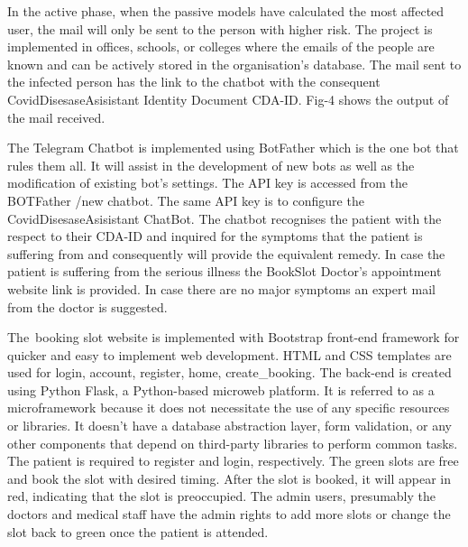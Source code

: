 \documentclass[12pt]{article}
\begin{document}
\begin{justify}
In the active phase, when the passive models have calculated the most affected user, the mail will only be sent to the person with higher risk. The project is implemented in offices, schools, or colleges where the emails of the people are known and can be actively stored in the organisation's database. The mail sent to the infected person has the link to the chatbot with the consequent CovidDisesaseAsisistant Identity Document CDA-ID. Fig-4 shows the output of the mail received.
\end{justify}
\begin{justify}
The Telegram Chatbot is implemented using BotFather which is the one bot that rules them all. It will assist in the development of new bots as well as the modification of existing bot’s settings. The API key is accessed from the BOTFather /new chatbot. The same API key is to configure the CovidDisesaseAsisistant ChatBot. The chatbot recognises the patient with the respect to their CDA-ID and inquired for the symptoms that the patient is suffering from and consequently will provide the equivalent remedy. In case the patient is suffering from the serious illness the BookSlot Doctor’s appointment website link is provided. In case there are no major symptoms an expert mail from the doctor is suggested.
\end{justify}
\begin{justify}
The\ booking slot website is implemented with Bootstrap front-end framework for quicker and easy to implement web development. HTML and CSS templates are used for login, account, register, home, create\_booking. The back-end is created using Python Flask, a Python-based microweb platform. It is referred to as a microframework because it does not necessitate the use of any specific resources or libraries. It doesn't have a database abstraction layer, form validation, or any other components that depend on third-party libraries to perform common tasks. The patient is required to register and login, respectively. The green slots are free and  book the slot with desired timing. After the slot is booked, it will appear in red, indicating that the slot is preoccupied. The admin users, presumably the doctors and medical staff have the admin rights to add more slots or change the slot back to green once the patient is attended.
\end{justify}

\vspace{\baselineskip}
\setlength{\parskip}{9.96pt}
\end{document}
